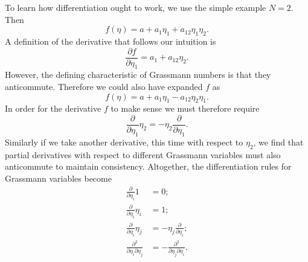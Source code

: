 To learn how differentiation ought to work, we use the simple example
$N=2$. Then
\begin{equation}
  f(\eta)=a+a_1\eta_1+a_{12}\eta_1\eta_2.
\end{equation}
A definition of the derivative that follows our intuition is
\begin{equation}
  \frac{\partial f}{\partial\eta_1}=a_1+a_{12}\eta_2.
\end{equation}
However, the defining characteristic of Grassmann numbers is that they
anticommute. Therefore we could also have expanded $f$ as
\begin{equation}
  f(\eta)=a+a_1\eta_1-a_{12}\eta_2\eta_1.
\end{equation}
In order for the derivative $f$ to make sense we must therefore require
\begin{equation}
  \frac{\partial}{\partial\eta_1}\eta_2=
  -\eta_2\frac{\partial}{\partial\eta_1}.
\end{equation}
Similarly if we take another derivative, this time with respect to $\eta_2$,
we find that partial derivatives with respect to different Grassmann variables
must also anticommute to maintain consistency. Altogether, the differentiation
rules for Grassmann variables become
\begin{equation}\begin{aligned}
  \frac{\partial}{\partial\eta_i}1&=0;\\
  \frac{\partial}{\partial\eta_i}\eta_i&=1;\\
  \frac{\partial}{\partial\eta_i}\eta_j&=
  -\eta_j\frac{\partial}{\partial\eta_i};\\
  \frac{\partial^2}{\partial\eta_i\partial\eta_j}&=
  -\frac{\partial^2}{\partial\eta_j\partial\eta_i}.
\end{aligned}\end{equation}

